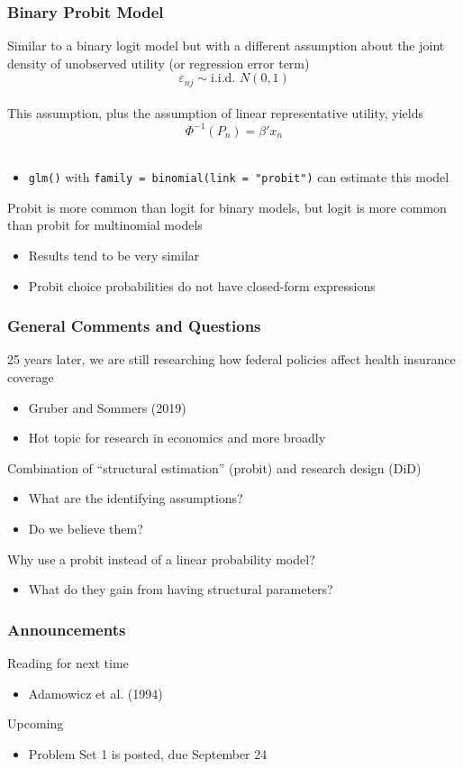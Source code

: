 \documentclass{beamer}
\begin{document}
\begin{frame}\frametitle{Binary Probit Model}
    Similar to a binary logit model but with a different assumption about the joint density of unobserved utility (or regression error term)
    $$\varepsilon_{nj} \sim \text{i.i.d.\ } N(0, 1)$$ \\
    \vspace{2ex}
    This assumption, plus the assumption of linear representative utility, yields
    $$\Phi^{-1}(P_n) = \beta' x_n$$ \\
    \vspace{-2ex}
    \begin{itemize}
    	\item \texttt{glm()} with \texttt{family = binomial(link = "probit")} can estimate this model
    \end{itemize}
    \vspace{2ex}
    Probit is more common than logit for binary models, but logit is more common than probit for multinomial models
    \begin{itemize}
    	\item Results tend to be very similar
    	\item Probit choice probabilities do not have closed-form expressions
    \end{itemize}
\end{frame}

\begin{frame}\frametitle{General Comments and Questions}
    25 years later, we are still researching how federal policies affect health insurance coverage
    \begin{itemize}
    	\item Gruber and Sommers (2019)
    	\item Hot topic for research in economics and more broadly
    \end{itemize}
    \vspace{2ex}
    Combination of ``structural estimation'' (probit) and research design (DiD)
    \begin{itemize}
    	\item What are the identifying assumptions?
    	\item Do we believe them?
    \end{itemize}
    \vspace{2ex}
    Why use a probit instead of a linear probability model?
    \begin{itemize}
    	\item What do they gain from having structural parameters?
    \end{itemize}
\end{frame}

\begin{frame}\frametitle{Announcements}
    Reading for next time
    \begin{itemize}
        \item Adamowicz et al. (1994)
    \end{itemize}
    \vspace{3ex}
    Upcoming
    \begin{itemize}
        \item Problem Set 1 is posted, due September 24
    \end{itemize}
\end{frame}
\end{document}
